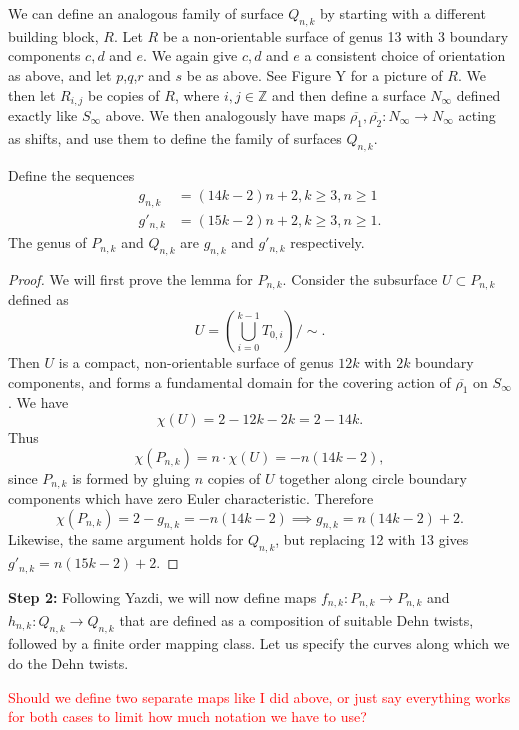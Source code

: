 We can define an analogous family of surface $Q_{n,k}$ by starting with a different building block, $R$. Let $R$ be a non-orientable surface of genus 13 with 3 boundary components $c,d$ and $e$. We again give $c, d$ and $e$ a consistent choice of orientation as above, and let $p$,$q$,$r$ and $s$ be as above. See Figure Y for a picture of $R$. We then let $R_{i,j}$ be copies of $R$, where $i,j \in \mathbb{Z}$ and then define a surface $N_\infty$ defined exactly like $S_\infty$ above. We then analogously have maps $\overline{\rho_1},\overline{\rho_2}: N_\infty \xrightarrow[]{} N_\infty$ acting as shifts, and use them to define the family of surfaces $Q_{n,k}$.

\begin{lem}
Define the sequences
\begin{align}
    g_{n,k} &= (14k - 2)n + 2, k \geq 3, n \geq 1 \\
    g'_{n,k} &= (15k - 2)n + 2, k \geq 3, n \geq 1.
\end{align}
    The genus of $P_{n,k}$ and $Q_{n,k}$ are $g_{n,k}$ and $g'_{n,k}$ respectively. 
\end{lem}
\begin{proof}
    We will first prove the lemma for $P_{n,k}$. Consider the subsurface $U \subset P_{n,k}$ defined as $$U = \left( \bigcup_{i =0}^{k-1} T_{0,i} \right)/\sim.$$ Then $U$ is a compact, non-orientable surface of genus $12k$ with $2k$ boundary components, and forms a fundamental domain for the covering action of $\overline{\rho_1}$ on $S_\infty$. We have $$\chi(U) = 2 - 12k - 2k = 2 - 14k.$$ Thus $$\chi(P_{n,k}) = n \cdot \chi(U) = -n(14k - 2),$$ since $P_{n,k}$ is formed by gluing $n$ copies of $U$ together along circle boundary components which have zero Euler characteristic. Therefore $$\chi(P_{n,k}) = 2 - g_{n,k} = -n(14k - 2) \implies g_{n,k} = n(14k - 2) + 2.$$ Likewise, the same argument holds for $Q_{n,k}$, but replacing 12 with 13 gives $g'_{n,k} = n(15k - 2) + 2$.
\end{proof}

\textbf{Step 2:} Following Yazdi, we will now define maps $f_{n,k}: P_{n,k} \xrightarrow[]{} P_{n,k}$ and $h_{n,k}: Q_{n,k} \xrightarrow[]{} Q_{n,k}$ that are defined as a composition of suitable Dehn twists, followed by a finite order mapping class. Let us specify the curves along which we do the Dehn twists.

\textcolor{red}{Should we define two separate maps like I did above, or just say everything works for both cases to limit how much notation we have to use?}

